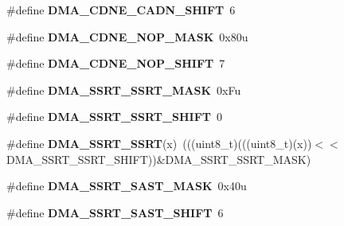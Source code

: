 \begin{DoxyCompactItemize}
\item 
\#define {\bfseries D\+M\+A\+\_\+\+C\+D\+N\+E\+\_\+\+C\+A\+D\+N\+\_\+\+S\+H\+I\+FT}~6\hypertarget{group__DMA__Register__Masks_ga45fa14dce342a18cb1ea15705a772671}{}\label{group__DMA__Register__Masks_ga45fa14dce342a18cb1ea15705a772671}

\item 
\#define {\bfseries D\+M\+A\+\_\+\+C\+D\+N\+E\+\_\+\+N\+O\+P\+\_\+\+M\+A\+SK}~0x80u\hypertarget{group__DMA__Register__Masks_ga8f22bcbf69b1598d53d60b7667079655}{}\label{group__DMA__Register__Masks_ga8f22bcbf69b1598d53d60b7667079655}

\item 
\#define {\bfseries D\+M\+A\+\_\+\+C\+D\+N\+E\+\_\+\+N\+O\+P\+\_\+\+S\+H\+I\+FT}~7\hypertarget{group__DMA__Register__Masks_gaa6e57536846087bab95bfb2f8895f626}{}\label{group__DMA__Register__Masks_gaa6e57536846087bab95bfb2f8895f626}

\item 
\#define {\bfseries D\+M\+A\+\_\+\+S\+S\+R\+T\+\_\+\+S\+S\+R\+T\+\_\+\+M\+A\+SK}~0x\+Fu\hypertarget{group__DMA__Register__Masks_gad3b3959cb4d1e1db5bbb4cc6291a0390}{}\label{group__DMA__Register__Masks_gad3b3959cb4d1e1db5bbb4cc6291a0390}

\item 
\#define {\bfseries D\+M\+A\+\_\+\+S\+S\+R\+T\+\_\+\+S\+S\+R\+T\+\_\+\+S\+H\+I\+FT}~0\hypertarget{group__DMA__Register__Masks_gacdadd55124a59d83a6b26976e85fb0ff}{}\label{group__DMA__Register__Masks_gacdadd55124a59d83a6b26976e85fb0ff}

\item 
\#define {\bfseries D\+M\+A\+\_\+\+S\+S\+R\+T\+\_\+\+S\+S\+RT}(x)~(((uint8\+\_\+t)(((uint8\+\_\+t)(x))$<$$<$D\+M\+A\+\_\+\+S\+S\+R\+T\+\_\+\+S\+S\+R\+T\+\_\+\+S\+H\+I\+FT))\&D\+M\+A\+\_\+\+S\+S\+R\+T\+\_\+\+S\+S\+R\+T\+\_\+\+M\+A\+SK)\hypertarget{group__DMA__Register__Masks_ga381ae16ec1d637479a855f345d3e160f}{}\label{group__DMA__Register__Masks_ga381ae16ec1d637479a855f345d3e160f}

\item 
\#define {\bfseries D\+M\+A\+\_\+\+S\+S\+R\+T\+\_\+\+S\+A\+S\+T\+\_\+\+M\+A\+SK}~0x40u\hypertarget{group__DMA__Register__Masks_gadcecaad6474bd238180952527a63130b}{}\label{group__DMA__Register__Masks_gadcecaad6474bd238180952527a63130b}

\item 
\#define {\bfseries D\+M\+A\+\_\+\+S\+S\+R\+T\+\_\+\+S\+A\+S\+T\+\_\+\+S\+H\+I\+FT}~6\hypertarget{group__DMA__Register__Masks_gac7f4ffa288a04ba1361b240caf7188d7}{}\label{group__DMA__Register__Masks_gac7f4ffa288a04ba1361b240caf7188d7}


\end{DoxyCompactItemize}
